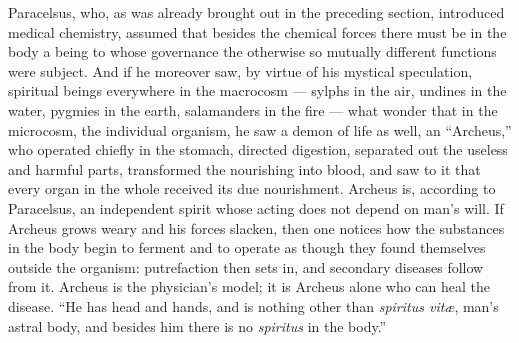 \documentclass[12pt,a4paper]{book}
\begin{document}
\setcounter{footnote}{0}
Paracelsus, who, as was already brought out in the preceding section,
introduced medical chemistry, assumed that besides the chemical forces there
must be in the body a being to whose governance the otherwise so mutually
different functions were subject. And if he moreover saw, by virtue of his
mystical speculation, spiritual beings everywhere in the macrocosm --- sylphs
in the air, undines in the water, pygmies in the earth, salamanders in the fire
--- what wonder that in the microcosm, the individual organism, he saw a demon
of life as well, an ``Archeus,'' who operated chiefly in the stomach, directed
digestion, separated out the useless and harmful parts, transformed the
nourishing into blood, and saw to it that every organ in the whole received its
due nourishment. Archeus is, according to Paracelsus, an independent spirit
whose acting does not depend on man's will. If Archeus grows weary and his
forces slacken, then one notices
how the substances in the body begin to ferment and to operate as though they
found themselves outside the organism: putrefaction then sets in, and secondary
diseases follow from it. Archeus is the physician's model; it is Archeus alone
who can heal the disease. ``He has head and hands, and is nothing other than
\textit{spiritus vitæ}, man's astral body, and besides him there is no
\textit{spiritus} in the body.''
\end{document}
